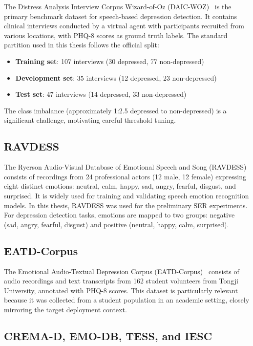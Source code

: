 The Distress Analysis Interview Corpus Wizard-of-Oz (DAIC-WOZ)~\cite{Gratch2014} is the primary benchmark dataset for speech-based depression detection. It contains clinical interviews conducted by a virtual agent with participants recruited from various locations, with PHQ-8 scores as ground truth labels. The standard partition used in this thesis follows the official split:
\begin{itemize}
    \item \textbf{Training set}: 107 interviews (30 depressed, 77 non-depressed)
    \item \textbf{Development set}: 35 interviews (12 depressed, 23 non-depressed)
    \item \textbf{Test set}: 47 interviews (14 depressed, 33 non-depressed)
\end{itemize}
The class imbalance (approximately 1:2.5 depressed to non-depressed) is a significant challenge, motivating careful threshold tuning.

\subsection{RAVDESS}

The Ryerson Audio-Visual Database of Emotional Speech and Song (RAVDESS)~\cite{Livingstone2018} consists of recordings from 24 professional actors (12 male, 12 female) expressing eight distinct emotions: neutral, calm, happy, sad, angry, fearful, disgust, and surprised. It is widely used for training and validating speech emotion recognition models. In this thesis, RAVDESS was used for the preliminary SER experiments. For depression detection tasks, emotions are mapped to two groups: negative (sad, angry, fearful, disgust) and positive (neutral, happy, calm, surprised).

\subsection{EATD-Corpus}

The Emotional Audio-Textual Depression Corpus (EATD-Corpus)~\cite{Shen2022} consists of audio recordings and text transcripts from 162 student volunteers from Tongji University, annotated with PHQ-8 scores. This dataset is particularly relevant because it was collected from a student population in an academic setting, closely mirroring the target deployment context.

\subsection{CREMA-D, EMO-DB, TESS, and IESC}

